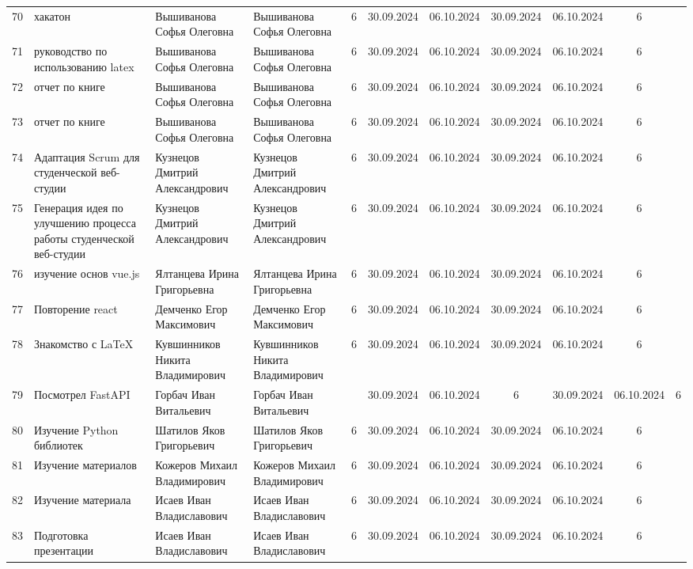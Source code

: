 \documentclass{article}
\begin{document}
\begin{table3}
{\begin{tabular}{|c|p{3.5cm}|p{3cm}|p{3cm}|c|c|c|c|c|c|}
70 & хакатон & Вышиванова Софья Олеговна & Вышиванова Софья Олеговна & 6  & 30.09.2024 & 06.10.2024 & 30.09.2024 & 06.10.2024 & 6 \\
71 & руководство по использованию latex & Вышиванова Софья Олеговна & Вышиванова Софья Олеговна & 6 & 30.09.2024 & 06.10.2024 & 30.09.2024 & 06.10.2024 & 6 \\
72 & отчет по книге & Вышиванова Софья Олеговна & Вышиванова Софья Олеговна & 6 & 30.09.2024 & 06.10.2024 & 30.09.2024 & 06.10.2024 & 6 \\
73 & отчет по книге & Вышиванова Софья Олеговна & Вышиванова Софья Олеговна & 6 & 30.09.2024 & 06.10.2024 & 30.09.2024 & 06.10.2024 & 6 \\
74 & Адаптация Scrum для студенческой веб-студии & Кузнецов Дмитрий Александрович & Кузнецов Дмитрий Александрович & 6 & 30.09.2024 & 06.10.2024 & 30.09.2024 & 06.10.2024 & 6 \\
75 & Генерация идея по улучшению процесса работы студенческой веб-студии & Кузнецов Дмитрий Александрович & Кузнецов Дмитрий Александрович & 6 & 30.09.2024 & 06.10.2024 & 30.09.2024 & 06.10.2024 & 6 \\
76 & изучение основ vue.js & Ялтанцева Ирина Григорьевна & Ялтанцева Ирина Григорьевна & 6 & 30.09.2024 & 06.10.2024 & 30.09.2024 & 06.10.2024 & 6 \\
77 & Повторение react & Демченко Егор Максимович  & Демченко Егор Максимович  & 6 & 30.09.2024 & 06.10.2024 & 30.09.2024 & 06.10.2024 & 6 \\
78 & Знакомство с LaTeX & Кувшинников Никита Владимирович & Кувшинников Никита Владимирович & 6 & 30.09.2024 & 06.10.2024 & 30.09.2024 & 06.10.2024 & 6 \\
79 & Посмотрел FastAPI & Горбач Иван Витальевич & Горбач Иван Витальевич &  & 30.09.2024 & 06.10.2024 & 6 & 30.09.2024 & 06.10.2024 & 6 \\
80 & Изучение Python библиотек & Шатилов Яков Григорьевич & Шатилов Яков Григорьевич & 6 & 30.09.2024 & 06.10.2024 & 30.09.2024 & 06.10.2024 & 6 \\
81 & Изучение материалов & Кожеров Михаил Владимирович  & Кожеров Михаил Владимирович  & 6 & 30.09.2024 & 06.10.2024 & 30.09.2024 & 06.10.2024 & 6 \\
82 & Изучение материала & Исаев Иван Владиславович & Исаев Иван Владиславович & 6 & 30.09.2024 & 06.10.2024 & 30.09.2024 & 06.10.2024 & 6 \\
83 & Подготовка презентации & Исаев Иван Владиславович & Исаев Иван Владиславович & 6 & 30.09.2024 & 06.10.2024 & 30.09.2024 & 06.10.2024 & 6 \\

\end{tabular}}
\end{table3}
\end{document}
